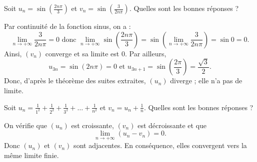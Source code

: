 \begin{question}
Soit $\displaystyle u_n=\sin\left(\frac{2n\pi}{3}\right)$ et $\displaystyle v_n=\sin\left(\frac{3}{2n\pi}\right)$. Quelles sont les bonnes réponses ?
\begin{answers}  
\end{answers}
\begin{explanations}
Par continuité de la fonction sinus, on a :
$$\displaystyle \lim _{n\to +\infty}\frac{3}{2n\pi}=0\mbox{ donc }\displaystyle \lim _{n\to +\infty}\sin\left(\frac{2n\pi}{3}\right)=\sin\left(\lim _{n\to +\infty}\frac{3}{2n\pi}\right)=\sin 0=0.$$
Ainsi, $(v_n)$ converge et sa limite est $0$. Par ailleurs, $$u_{3n}=\sin (2n\pi)=0\mbox{ et }u_{3n+1}=\sin \left(\frac{2\pi}{3}\right)=\frac{\sqrt{3}}{2}.$$
Donc, d'après le théorème des suites extraites, $(u_n)$ diverge ; elle n'a pas de limite.
\end{explanations}
\end{question}



\begin{question}
Soit $\displaystyle u_n=\frac{1}{1^2}+\frac{1}{2^2}+\frac{1}{3^2}+\dots+\frac{1}{n^2}$ et $\displaystyle v_n=u_n+\frac{1}{n}$. Quelles sont les bonnes réponses ?
\begin{answers}  
\end{answers}
\begin{explanations}
On vérifie que $(u_n)$ est croissante, $(v_n)$ est décroissante et que 
$$\displaystyle \lim _{n\to +\infty}(u_n-v_n)=0.$$
Donc $(u_n)$ et $(v_n)$ sont adjacentes. En conséquence, elles convergent vers la même limite finie.
\end{explanations}
\end{question}


